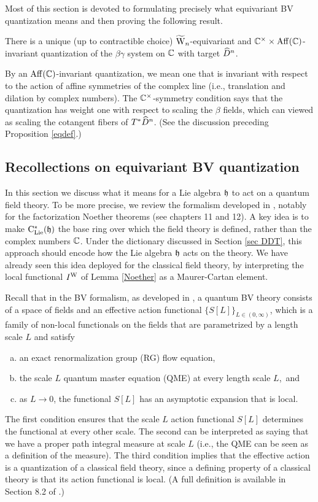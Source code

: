 Most of this section is devoted to formulating precisely what equivariant BV quantization means and then proving the following result.

\begin{thm} \label{bvq} 
There is a unique (up to contractible choice) $\widetilde{{{\rm W}}}_n$-equivariant and $\mathbb C^\times \times {\rm Aff}(\mathbb C)$-invariant quantization 
of the $\beta\gamma$ system on $\mathbb C$ with target $\widehat{D}^n$.
\end{thm}

By an ${\rm Aff}(\mathbb C)$-invariant quantization, we mean one that is invariant with respect to the action of affine symmetries of the complex line (i.e., translation and dilation by complex numbers). 
The $\mathbb C^\times$-symmetry condition says that the quantization has weight one with respect to scaling the $\beta$ fields, which can viewed as scaling the cotangent fibers of $T^*\widehat{D}^n$.
(See the discussion preceding Proposition \ref{eqdef}.)

\subsection{Recollections on equivariant BV quantization} \label{sec equiv bv 1}

In this section we discuss what it means for a Lie algebra $\mathfrak h$ to act on a quantum field theory.
To be more precise, we review the formalism developed in \cite{CG}, notably for the factorization Noether theorems  (see chapters 11 and 12).
A key idea is to make ${\rm C}_{\rm Lie}^*(\mathfrak h)$ the base ring over which the field theory is defined, rather than the complex numbers $\mathbb C$.
Under the dictionary discussed in Section \ref{sec DDT}, this approach should encode how the Lie algebra $\mathfrak h$ acts on the theory.
We have already seen this idea deployed for the classical field theory, 
by interpreting the local functional $I^{\rm W}$ of Lemma \ref{Noether} as a Maurer-Cartan element.

Recall that in the BV formalism, as developed in \cite{CosBook,CG}, 
a quantum BV theory consists of a space of fields and an effective action functional $\{S[L]\}_{L \in (0,\infty)}$,
which is a family of non-local functionals on the fields that are parametrized by a length scale $L$ 
and satisfy
\begin{enumerate}[(a)]
\item an exact renormalization group (RG) flow equation,
\item the scale $L$ quantum master equation (QME) at every length scale $L$,~and
\item as $L \to 0$, the functional $S[L]$ has an asymptotic expansion that is local.
\end{enumerate}
The first condition ensures that the scale $L$ action functional $S[L]$ determines the functional at every other scale.
The second can be interpreted as saying that we have a proper path integral measure at scale $L$ 
(i.e., the QME can be seen as a definition of the measure).
The third condition implies that the effective action is a quantization of a classical field theory,
since a defining property of a classical theory is that its action functional is local.
(A full definition is available in Section 8.2 of \cite{CG}.)

